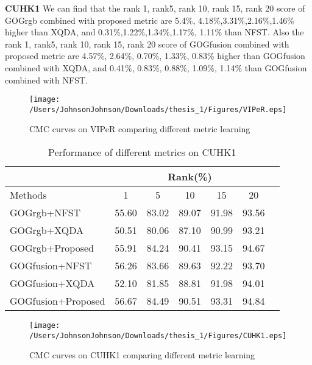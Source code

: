 \textbf{CUHK1} We can find that the rank 1, rank5, rank 10, rank 15, rank 20 score of GOGrgb combined with proposed metric are 5.4\%, 4.18\%,3.31\%,2.16\%,1.46\% higher than XQDA, and 0.31\%,1.22\%,1.34\%,1.17\%, 1.11\% than NFST.  Also the  rank 1, rank5, rank 10, rank 15, rank 20 score of GOGfusion combined with proposed metric are 4.57\%, 2.64\%, 0.70\%, 1.33\%, 0.83\% higher than GOGfusion combined with XQDA, and 0.41\%, 0.83\%, 0.88\%, 1.09\%, 1.14\% than GOGfusion combined with NFST.  

\begin{figure}[H]
\begin{raggedleft}
\texttt{[image: /Users/JohnsonJohnson/Downloads/thesis\_1/Figures/VIPeR.eps]}
\vspace{-3em}
\caption{CMC curves on VIPeR comparing different metric learning}
\end{raggedleft}
\end{figure}

\begin{table}[H]
\caption{Performance of different metrics on CUHK1}
\centering
\begin{tabular}{|l|c|c|c|c|c|c|}
\hline
& \multicolumn{5}{|c|}{Rank(\%)} \\
\hline
Methods& 1 & 5 &10&15& 20\\
\hline
GOGrgb+NFST&55.60 &83.02 &89.07 &91.98&93.56 \\ 
\hline
GOGrgb+XQDA&50.51 &80.06 &87.10 &90.99&93.21 \\ 
\hline
GOGrgb+Proposed&55.91&84.24&90.41& 93.15&94.67\\  %
\hline
GOGfusion+NFST&56.26 &83.66 &89.63 &92.22&93.70 \\ 
\hline
GOGfusion+XQDA&52.10 &81.85&88.81 &91.98&94.01\\ 
\hline
GOGfusion+Proposed&56.67&84.49& 90.51& 93.31&94.84\\


\hline

\end{tabular}\newline
\end{table}


\begin{figure}[H]
\centering
\texttt{[image: /Users/JohnsonJohnson/Downloads/thesis\_1/Figures/CUHK1.eps]}
\vspace{-3em}
\caption{CMC curves on CUHK1 comparing different metric learning}
\end{figure}

